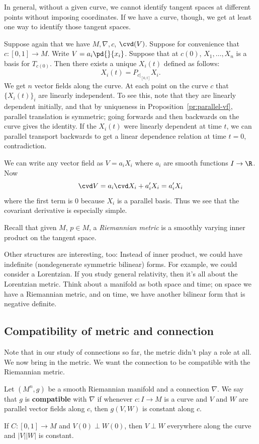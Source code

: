 In general, without a given curve, we cannot identify tangent spaces at different points without imposing coordinates. If we have a curve, though, we get at least one way to identify those tangent spaces. %

Suppose again that we have $M,\nabla,c$, $\cvd(V)$. Suppose for convenience that $c:[0,1]\to M$. Write $V=a_i\pd{}{x_i}$.
Suppose that at $c(0)$, $X_1,\ldots,X_n$ is a basis for $T_{c(0)}$. Then there exists a unique $X_i(t)$ defined as follows:
\[
X_i(t)=P_{c|_{[0,t]}}X_i.
\]
We get $n$ vector fields along the curve. At each point on the curve $c$ that $\{X_i(t)\}_i$ are linearly independent. To see this, note that they are linearly dependent initially, and that by uniqueness in Proposition~\ref{pr:parallel-vf}, parallel translation is symmetric; going forwards and then backwards on the curve gives the identity. If the $X_i(t)$ were linearly dependent at time $t$, we can parallel transport backwards to get a linear dependence relation at time $t=0$, contradiction. %

We can write any vector field as $V=a_iX_i$ where $a_i$ are smooth functions $I\to \R$. Now %
\[
\cvd V=a_i \cvd X_i+a_i'X_i=a_i'X_i
\]
where the first term is 0 because $X_i$ is a parallel basis. Thus we see that the covariant derivative is especially simple.

Recall that given $M$, $p\in M$, a {\it Riemannian metric} is a smoothly varying inner product on the tangent space.

Other structures are interesting, too: Instead of inner product, we could have indefinite (nondegenerate symmetric bilinear) forms. For example, we could consider a Lorentzian. If you study general relativity, then it's all about the Lorentzian metric. Think about a manifold as both space and time; on space we have a Riemannian metric, and on time, we have another bilinear form that is negative definite.

\subsection{Compatibility of metric and connection}
Note that in our study of connections so far, the metric didn't play a role at all. We now bring in the metric. We want the connection to be compatible with the Riemannian metric.
\begin{df}
Let $(M^n,g)$ be a smooth Riemannian manifold and a connection $\nabla$. We say that $g$ is \textbf{compatible} with $\nabla$ if whenever $c:I\to M$ is a curve and $V$ and $W$ are parallel vector fields along $c$, then $g(V,W)$ is constant along $c$. 
\end{df}
If $C:[0,1]\to M$ and $V(0)\perp W(0)$, then $V\perp W$ everywhere along the curve and $|V||W|$ is constant.

